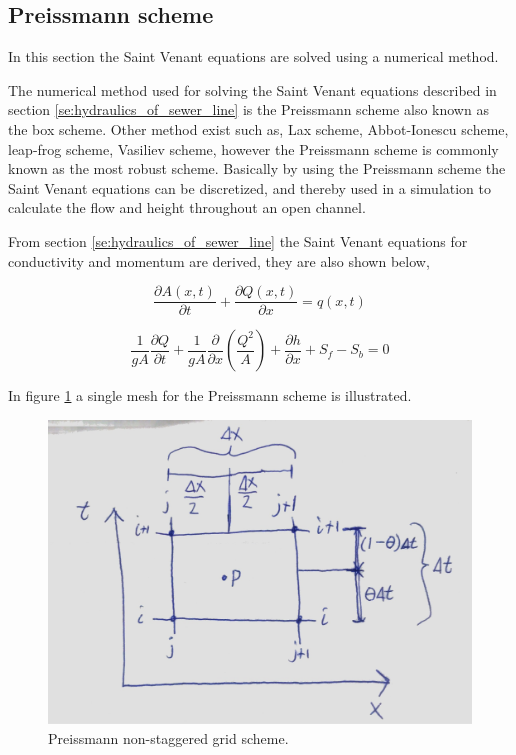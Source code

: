 ﻿\subsection{Preissmann scheme}\label{subse:preissmann_scheme}
In this section the Saint Venant equations are solved using a numerical method. 


The numerical method used for solving the Saint Venant equations described in section \ref{se:hydraulics_of_sewer_line} is the Preissmann scheme also known as the box scheme. Other method exist such as, Lax scheme, Abbot-Ionescu scheme, leap-frog scheme, Vasiliev scheme, however the Preissmann scheme is commonly known as the most robust scheme. Basically by using the Preissmann scheme the Saint Venant equations can be discretized, and thereby used in a simulation to calculate the flow and height throughout an open channel.   

From section \ref{se:hydraulics_of_sewer_line} the Saint Venant equations for conductivity and momentum are derived, they are also shown below,

\begin{equation}\label{eq:saintbernard_mass_preiss}
\frac{\partial A(x,t)}{\partial t} + \frac{\partial Q(x,t)}{\partial x}=q(x,t)
\end{equation}

\begin{equation}\label{eq:saintbernard_momentum_preiss}
\frac{1}{gA} \frac{\partial Q}{\partial t} +\frac{1}{gA}\frac{\partial}{\partial x} \left( \frac{Q^2}{A} \right) + \frac{\partial h}{\partial x} + S_f - S_b = 0
\end{equation}


In figure \ref{fig:preissmann_grid_scheme} a single mesh for the Preissmann scheme is illustrated.

\begin{figure}[H]
\centering
\includegraphics[width=.6\textwidth]{report/modeling/pictures/preissmann_scheme}
\caption{Preissmann non-staggered grid scheme.}
\label{fig:preissmann_grid_scheme}
\end{figure} 

